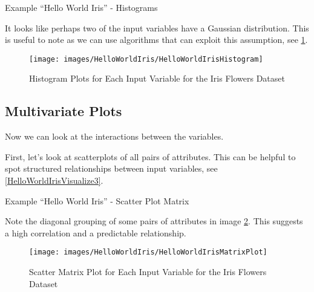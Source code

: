 \begin{code}
      
    
  \caption{Example ``Hello World Iris'' - Histograms} \label{HelloWorldIrisVisualize2}
\end{code}      

It looks like perhaps two of the input variables have a Gaussian distribution. This is useful to note as we can use algorithms that can exploit this assumption, see \ref{HelloWorldIrisHistogram}.
    
\begin{figure}
  \centering
    
  \texttt{[image: images/HelloWorldIris/HelloWorldIrisHistogram]}
    
  \caption{Histogram Plots for Each Input Variable for the Iris Flowers Dataset}\label{HelloWorldIrisHistogram}
\end{figure}    
    
  
    
\subsection{Multivariate Plots}

Now we can look at the interactions between the variables.
    
First, let's look at scatterplots of all pairs of attributes. This can be helpful to spot structured relationships between input variables, see \ref{HelloWorldIrisVisualize3}.
    
    
\begin{code}
      
    
  \caption{Example ``Hello World Iris'' - Scatter Plot Matrix} \label{HelloWorldIrisVisualize3}
\end{code}      
    
Note the diagonal grouping of some pairs of attributes in image \ref{HelloWorldIrisMatrixPlot}. This suggests a high correlation and a predictable relationship.
    
\begin{figure}
  \centering
    
  \texttt{[image: images/HelloWorldIris/HelloWorldIrisMatrixPlot]}
    
  \caption{Scatter Matrix Plot for Each Input Variable for the Iris Flowers Dataset}\label{HelloWorldIrisMatrixPlot}
\end{figure}    

